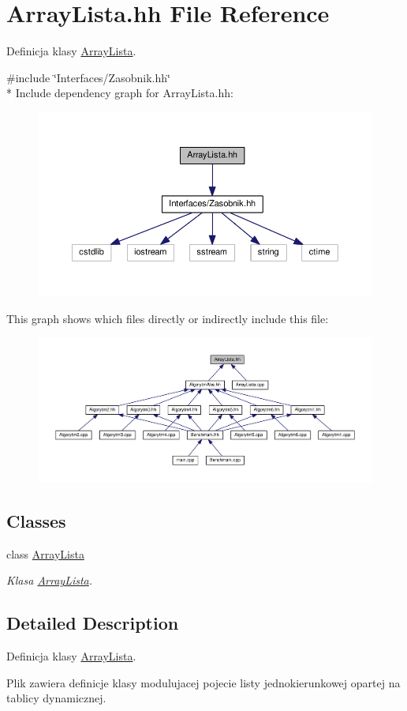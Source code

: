 \hypertarget{a00034}{}\section{Array\+Lista.\+hh File Reference}
\label{a00034}


Definicja klasy \hyperlink{a00008}{Array\+Lista}.  


{\ttfamily \#include \char`\"{}Interfaces/\+Zasobnik.\+hh\char`\"{}}\\*
Include dependency graph for Array\+Lista.\+hh\+:
\nopagebreak
\begin{figure}[H]
\begin{center}
\leavevmode
\includegraphics[width=350pt]{a00081}
\end{center}
\end{figure}
This graph shows which files directly or indirectly include this file\+:
\nopagebreak
\begin{figure}[H]
\begin{center}
\leavevmode
\includegraphics[width=350pt]{a00082}
\end{center}
\end{figure}
\subsection*{Classes}
\begin{DoxyCompactItemize}
\item 
class \hyperlink{a00008}{Array\+Lista}
\begin{DoxyCompactList}\small\item\em Klasa \hyperlink{a00008}{Array\+Lista}. \end{DoxyCompactList}\end{DoxyCompactItemize}


\subsection{Detailed Description}
Definicja klasy \hyperlink{a00008}{Array\+Lista}. 

Plik zawiera definicje klasy modulujacej pojecie listy jednokierunkowej opartej na tablicy dynamicznej. 